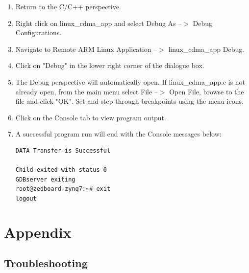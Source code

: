\documentclass[12pt]{article}
\begin{document}
\begin{enumerate}
\item Return to the C/C++ perspective.
\item Right click on linux\_cdma\_app and select Debug As --$>$ Debug Configurations.
\item Navigate to Remote ARM Linux Application --$>$ linux\_cdma\_app Debug.
\item Click on "Debug" in the lower right corner of the dialogue box.
\item The Debug perspective will automatically open.  If linux\_cdma\_app.c is not already open, from the main menu select File --$>$ Open File, browse to the file and click "OK". Set and step through breakpoints using the menu icons.
\item Click on the Console tab to view program output.
\item A successful program run will end with the Console messages below:
\begin{lstlisting}
DATA Transfer is Successful

Child exited with status 0
GDBserver exiting
root@zedboard-zynq7:~# exit
logout
\end{lstlisting}
\end{enumerate}
\section{Appendix}
\subsection{Troubleshooting}
\end{document}
